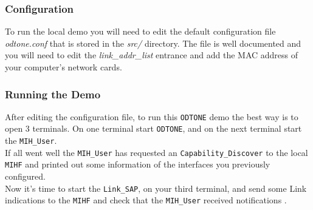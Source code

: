 \documentclass[11pt]{article}
\begin{document}
\subsubsection{Configuration}
\label{sec-2.1.1}

   To run the local demo you will need to edit the default
   configuration file \emph{odtone.conf} that is stored in the \textit{src/}
   directory. The file is well documented and you will need to edit
   the \emph{link\_addr\_list} entrance and add the MAC address of your
   computer's network cards. \\

%


\subsubsection{Running the Demo}
\label{sec-2.1.2}


   After editing the configuration file, to run this \texttt{ODTONE} demo the
   best way is to open 3 terminals. On one terminal start \texttt{ODTONE},
   and on the next terminal start the \texttt{MIH\_User}. \\
%
%

    If all went well the \texttt{MIH\_User} has requested an \texttt{Capability\_Discover}
    to the local \texttt{MIHF} and printed out some information of the
    interfaces you previously configured. \\

    Now it's time to start the \texttt{Link\_SAP}, on your third terminal, and
    send some Link indications to the \texttt{MIHF} and check that the \texttt{MIH\_User}
    received notifications . \\
%
\end{document}
